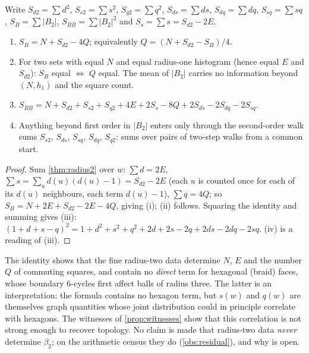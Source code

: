 \begin{corollary}\label{cor:moments}
Write $S_{d2}=\sum d^2$, $S_{s2}=\sum s^2$, $S_{q2}=\sum q^2$, $S_{ds}=\sum ds$, $S_{dq}=\sum dq$, $S_{sq}=\sum sq$, $S_{B}=\sum|B_2|$, $S_{BB}=\sum|B_2|^2$ and $S_s=\sum s=S_{d2}-2E$.
\begin{enumerate}[label=(\roman*)]
\item $S_B=N+S_{d2}-4Q$; equivalently $Q=(N+S_{d2}-S_B)/4$.
\item For two sets with equal $N$ and equal radius-one histogram (hence equal $E$ and $S_{d2}$): $S_B$ equal $\iff$ $Q$ equal. The mean of $|B_2|$ carries no information beyond $(N,h_1)$ and the square count.
\item $S_{BB}=N+S_{d2}+S_{s2}+S_{q2}+4E+2S_s-8Q+2S_{ds}-2S_{dq}-2S_{sq}$.
\item Anything beyond first order in $|B_2|$ enters only through the second-order walk sums $S_{s2}$, $S_{ds}$, $S_{sq}$, $S_{dq}$, $S_{q2}$: sums over pairs of two-step walks from a common start.
\end{enumerate}
\end{corollary}
\begin{proof}
Sum \cref{thm:radius2} over $w$: $\sum d=2E$, $\sum s=\sum_u d(u)(d(u)-1)=S_{d2}-2E$ (each $u$ is counted once for each of its $d(u)$ neighbours, each term $d(u)-1$), $\sum q=4Q$; so $S_B=N+2E+S_{d2}-2E-4Q$, giving (i); (ii) follows. Squaring the identity and summing gives (iii): $(1+d+s-q)^2=1+d^2+s^2+q^2+2d+2s-2q+2ds-2dq-2sq$. (iv) is a reading of (iii).
\end{proof}
\begin{remark}
The identity shows that the fine radius-two data determine $N$, $E$ and the number $Q$ of commuting squares, and contain no \emph{direct} term for hexagonal (braid) faces, whose boundary $6$-cycles first affect balls of radius three. The latter is an interpretation: the formula contains no hexagon term, but $s(w)$ and $q(w)$ are themselves graph quantities whose joint distribution could in principle correlate with hexagons. The witnesses of \cref{prop:witnesses} show that this correlation is not strong enough to recover topology. No claim is made that radius-two data \emph{never} determine $\beta_2$; on the arithmetic census they do (\cref{obs:residual}), and why is open.
\end{remark}
